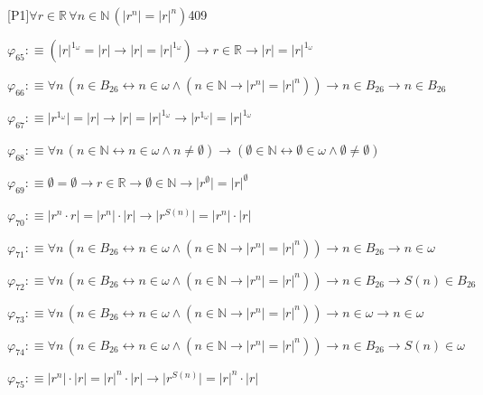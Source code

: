\begin{fullproof}{[P1]}{$\forall r \in \mathbb{R}\,\forall n \in \mathbb{N}\,(\lvert {{r}^{n}} \rvert = {{\lvert r \rvert}^{n}})$}{409}
\begin{abbrevlist}
\item $\varphi_{65} :\equiv ({{\lvert r \rvert}^{1_{\omega}}} = \lvert r \rvert \to \lvert r \rvert = {{\lvert r \rvert}^{1_{\omega}}}) \to r \in \mathbb{R} \to \lvert r \rvert = {{\lvert r \rvert}^{1_{\omega}}}$
\item $\varphi_{66} :\equiv \forall n\,(n \in B_{26} \leftrightarrow n \in \omega \land (n \in \mathbb{N} \to \lvert {{r}^{n}} \rvert = {{\lvert r \rvert}^{n}})) \to n \in B_{26} \to n \in B_{26}$
\item $\varphi_{67} :\equiv \lvert {{r}^{1_{\omega}}} \rvert = \lvert r \rvert \to \lvert r \rvert = {{\lvert r \rvert}^{1_{\omega}}} \to \lvert {{r}^{1_{\omega}}} \rvert = {{\lvert r \rvert}^{1_{\omega}}}$
\item $\varphi_{68} :\equiv \forall n\,(n \in \mathbb{N} \leftrightarrow n \in \omega \land n \neq \emptyset) \to (\emptyset \in \mathbb{N} \leftrightarrow \emptyset \in \omega \land \emptyset \neq \emptyset)$
\item $\varphi_{69} :\equiv \emptyset = \emptyset \to r \in \mathbb{R} \to \emptyset \in \mathbb{N} \to \lvert {{r}^{\emptyset}} \rvert = {{\lvert r \rvert}^{\emptyset}}$
\item $\varphi_{70} :\equiv \lvert {{r}^{n}} \cdot r \rvert = \lvert {{r}^{n}} \rvert \cdot \lvert r \rvert \to \lvert {{r}^{S(n)}} \rvert = \lvert {{r}^{n}} \rvert \cdot \lvert r \rvert$
\item $\varphi_{71} :\equiv \forall n\,(n \in B_{26} \leftrightarrow n \in \omega \land (n \in \mathbb{N} \to \lvert {{r}^{n}} \rvert = {{\lvert r \rvert}^{n}})) \to n \in B_{26} \to n \in \omega$
\item $\varphi_{72} :\equiv \forall n\,(n \in B_{26} \leftrightarrow n \in \omega \land (n \in \mathbb{N} \to \lvert {{r}^{n}} \rvert = {{\lvert r \rvert}^{n}})) \to n \in B_{26} \to S(n) \in B_{26}$
\item $\varphi_{73} :\equiv \forall n\,(n \in B_{26} \leftrightarrow n \in \omega \land (n \in \mathbb{N} \to \lvert {{r}^{n}} \rvert = {{\lvert r \rvert}^{n}})) \to n \in \omega \to n \in \omega$
\item $\varphi_{74} :\equiv \forall n\,(n \in B_{26} \leftrightarrow n \in \omega \land (n \in \mathbb{N} \to \lvert {{r}^{n}} \rvert = {{\lvert r \rvert}^{n}})) \to n \in B_{26} \to S(n) \in \omega$
\item $\varphi_{75} :\equiv \lvert {{r}^{n}} \rvert \cdot \lvert r \rvert = {{\lvert r \rvert}^{n}} \cdot \lvert r \rvert \to \lvert {{r}^{S(n)}} \rvert = {{\lvert r \rvert}^{n}} \cdot \lvert r \rvert$

\end{abbrevlist}
\end{fullproof}
